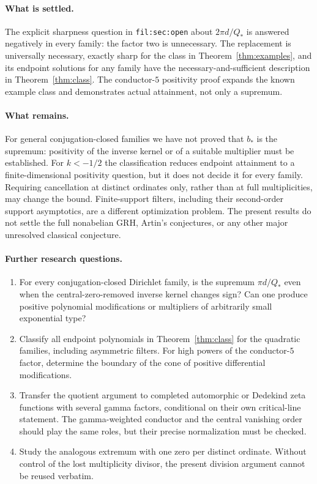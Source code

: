 \documentclass[11pt]{article}
\theoremstyle{remark}\newtheorem{remark}[theorem]{Remark}
\begin{document}
\paragraph{What is settled.} The explicit sharpness question in \texttt{fil:sec:open} about $2\pi d/Q_*$ is answered negatively in every family: the factor two is unnecessary. The replacement is universally necessary, exactly sharp for the class in Theorem~\ref{thm:examples}, and its endpoint solutions for any family have the necessary-and-sufficient description in Theorem~\ref{thm:class}. The conductor-$5$ positivity proof expands the known example class and demonstrates actual attainment, not only a supremum.

\paragraph{What remains.} For general conjugation-closed families we have not proved that $b_*$ is the supremum: positivity of the inverse kernel or of a suitable multiplier must be established. For $k<-1/2$ the classification reduces endpoint attainment to a finite-dimensional positivity question, but it does not decide it for every family. Requiring cancellation at distinct ordinates only, rather than at full multiplicities, may change the bound. Finite-support filters, including their second-order support asymptotics, are a different optimization problem. The present results do not settle the full nonabelian GRH, Artin's conjectures, or any other major unresolved classical conjecture.

\paragraph{Further research questions.}
\begin{enumerate}
\item For every conjugation-closed Dirichlet family, is the supremum $\pi d/Q_*$ even when the central-zero-removed inverse kernel changes sign? Can one produce positive polynomial modifications or multipliers of arbitrarily small exponential type?
\item Classify all endpoint polynomials in Theorem~\ref{thm:class} for the quadratic families, including asymmetric filters. For high powers of the conductor-$5$ factor, determine the boundary of the cone of positive differential modifications.
\item Transfer the quotient argument to completed automorphic or Dedekind zeta functions with several gamma factors, conditional on their own critical-line statement. The gamma-weighted conductor and the central vanishing order should play the same roles, but their precise normalization must be checked.
\item Study the analogous extremum with one zero per distinct ordinate. Without control of the lost multiplicity divisor, the present division argument cannot be reused verbatim.
\end{enumerate}
\end{document}

